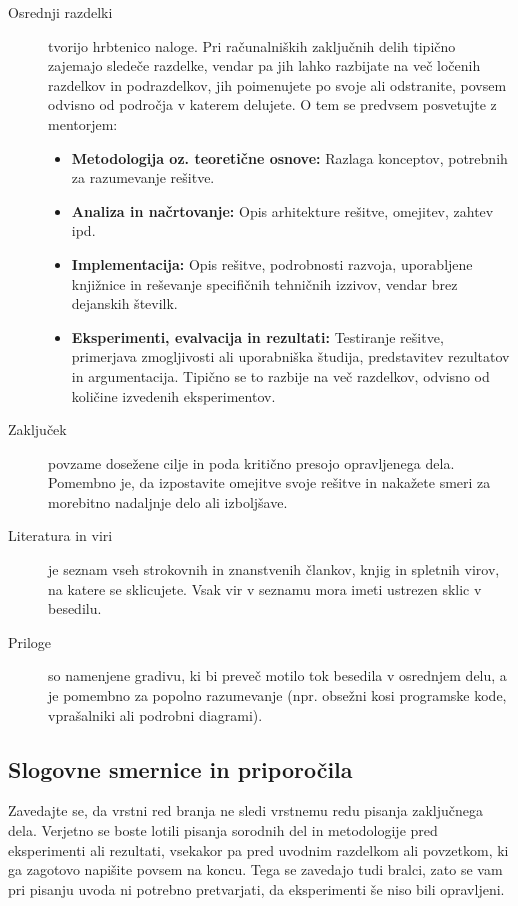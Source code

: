\documentclass[9pt]{style/friteza}
\begin{document}
\begin{description}
    \item[Osrednji razdelki] tvorijo hrbtenico naloge. Pri računalniških zaključnih delih tipično zajemajo sledeče razdelke, vendar pa jih lahko razbijate na več ločenih razdelkov in podrazdelkov, jih poimenujete po svoje ali odstranite, povsem odvisno od področja v katerem delujete. O tem se predvsem posvetujte z mentorjem:
    \begin{itemize}
        \item \textbf{Metodologija oz. teoretične osnove:} Razlaga konceptov, potrebnih za razumevanje rešitve.
        \item \textbf{Analiza in načrtovanje:} Opis arhitekture rešitve, omejitev, zahtev ipd.
        \item \textbf{Implementacija:} Opis rešitve, podrobnosti razvoja, uporabljene knjižnice in reševanje specifičnih tehničnih izzivov, vendar brez dejanskih številk.
        \item \textbf{Eksperimenti, evalvacija in rezultati:} Testiranje rešitve, primerjava zmogljivosti ali uporabniška študija, predstavitev rezultatov in argumentacija. Tipično se to razbije na več razdelkov, odvisno od količine izvedenih eksperimentov.
    \end{itemize}
    
    \item[Zaključek] povzame dosežene cilje in poda kritično presojo opravljenega dela. Pomembno je, da izpostavite omejitve svoje rešitve in nakažete smeri za morebitno nadaljnje delo ali izboljšave.
    
    \item[Literatura in viri] je seznam vseh strokovnih in znanstvenih člankov, knjig in spletnih virov, na katere se sklicujete. Vsak vir v seznamu mora imeti ustrezen sklic v besedilu.
    
    \item[Priloge] so namenjene gradivu, ki bi preveč motilo tok besedila v osrednjem delu, a je pomembno za popolno razumevanje (npr. obsežni kosi programske kode, vprašalniki ali podrobni diagrami).
\end{description}

\subsection{Slogovne smernice in priporočila}

Zavedajte se, da vrstni red branja ne sledi vrstnemu redu pisanja zaključnega dela. Verjetno se boste lotili pisanja sorodnih del in metodologije pred eksperimenti ali rezultati, vsekakor pa pred uvodnim razdelkom ali povzetkom, ki ga zagotovo napišite povsem na koncu. Tega se zavedajo tudi bralci, zato se vam pri pisanju uvoda ni potrebno pretvarjati, da eksperimenti še niso bili opravljeni.
\end{document}
